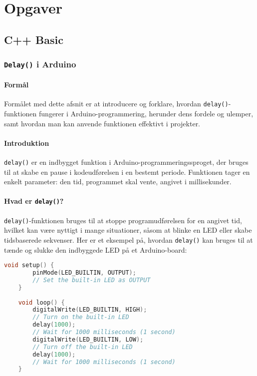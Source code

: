 \part{Opgaver}
\chapter{C++ Basic}
\section{\texttt{Delay()} i Arduino}

\subsection*{Formål}
Formålet med dette afsnit er at introducere og forklare, hvordan \texttt{delay()}-funktionen fungerer i Arduino-programmering, herunder dens fordele og ulemper, samt hvordan man kan anvende funktionen effektivt i projekter.

\subsection*{Introduktion}
\texttt{delay()} er en indbygget funktion i Arduino-programmeringssproget, der bruges til at skabe en pause i kodeudførelsen i en bestemt periode. Funktionen tager en enkelt parameter: den tid, programmet skal vente, angivet i millisekunder.

\subsection*{Hvad er \texttt{delay()}?}
\texttt{delay()}-funktionen bruges til at stoppe programudførelsen for en angivet tid, hvilket kan være nyttigt i mange situationer, såsom at blinke en LED eller skabe tidsbaserede sekvenser. Her er et eksempel på, hvordan \texttt{delay()} kan bruges til at tænde og slukke den indbyggede LED på et Arduino-board:

\begin{lstlisting}[language=C++, caption={Using the \texttt{delay()} function with the built-in LED.}]
	void setup() {
		pinMode(LED_BUILTIN, OUTPUT); 
		// Set the built-in LED as OUTPUT
	}
	
	void loop() {
		digitalWrite(LED_BUILTIN, HIGH); 
		// Turn on the built-in LED
		delay(1000);                     
		// Wait for 1000 milliseconds (1 second)
		digitalWrite(LED_BUILTIN, LOW);  
		// Turn off the built-in LED
		delay(1000);                     
		// Wait for 1000 milliseconds (1 second)
	}
\end{lstlisting}

